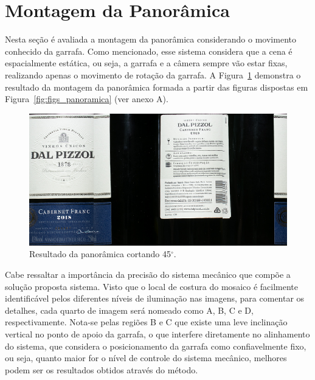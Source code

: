 \section{Montagem da Panorâmica}

Nesta seção é avaliada a montagem da panorâmica considerando o movimento conhecido da garrafa. Como mencionado, esse sistema considera que a cena é espacialmente estática, ou seja, a garrafa e a câmera sempre vão estar fixas, realizando apenas o movimento de rotação 
da garrafa. A Figura~\ref{fig:panoramica} demonstra o resultado da montagem da panorâmica formada a partir das figuras dispostas em Figura~\ref{fig:figs_panoramica} (ver anexo A).

\begin{figure}[ht]
    \caption{Resultado da panorâmica cortando 45$^\circ$.}
    \centering
    \vspace{.3cm}
    \begin{minipage}{\textwidth}
    \includegraphics[width=\textwidth]{TCC/Imagens/result_45.png}
	\end{minipage}
    \label{fig:panoramica}
\end{figure}

Cabe ressaltar a importância da precisão do sistema mecânico que compõe a solução proposta sistema. Visto que o local de costura do mosaico é facilmente identificável pelos diferentes níveis de iluminação nas imagens, para comentar os detalhes, cada quarto de imagem será nomeado como A, B, C e D, respectivamente. Nota-se pelas  regiões 
B e C que existe uma leve inclinação vertical no ponto de apoio da garrafa, o que interfere diretamente no alinhamento do sistema, que considera o posicionamento da garrafa como confiavelmente fixo, ou seja, quanto maior for o nível de controle do sistema mecânico, melhores podem ser os resultados obtidos através do método.

